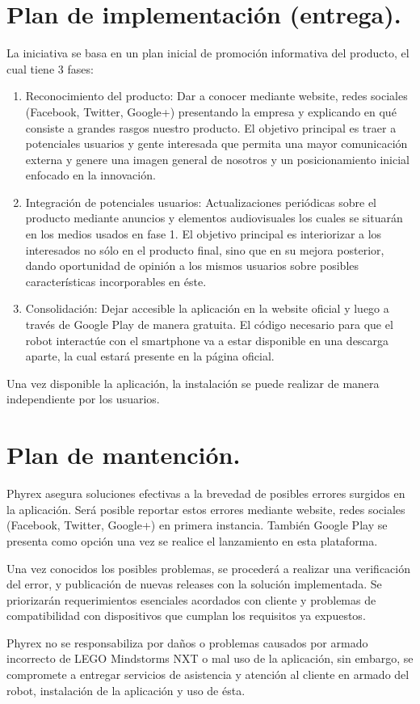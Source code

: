 \section{Plan de implementaci\'on (entrega).}
La iniciativa se basa en un plan inicial de promoci\'on informativa del producto, el cual tiene 3 fases:

\begin{enumerate}
\item  Reconocimiento del producto: Dar a conocer mediante website, redes sociales (Facebook, Twitter, Google+) presentando la empresa y explicando en qu\'e consiste a grandes rasgos nuestro producto. El objetivo principal es traer a potenciales usuarios y gente interesada que permita una mayor comunicaci\'on externa y genere una imagen general de nosotros y un posicionamiento inicial enfocado en la innovaci\'on.
\item Integraci\'on de potenciales usuarios: Actualizaciones peri\'odicas sobre el producto mediante anuncios y elementos audiovisuales los cuales se situar\'an en los medios usados en fase 1. El objetivo principal es interiorizar a los interesados no s\'olo en el producto final, sino que en su mejora posterior, dando oportunidad de opini\'on a los mismos usuarios sobre posibles caracter\'isticas incorporables en \'este.
\item Consolidaci\'on: Dejar accesible la aplicaci\'on en la website oficial y luego a trav\'es de Google Play de manera gratuita. El c\'odigo necesario para que el robot interact\'ue con el smartphone va a estar disponible en una descarga aparte, la cual estar\'a presente en la p\'agina oficial.
\end{enumerate}

Una vez disponible la aplicaci\'on, la instalaci\'on se puede realizar de manera independiente por los usuarios.

\newpage
\section{Plan de mantenci\'on.}
Phyrex asegura soluciones efectivas a la brevedad de posibles errores surgidos en la aplicaci\'on. Ser\'a posible reportar estos errores mediante website, redes sociales (Facebook, Twitter, Google+) en primera instancia. Tambi\'en Google Play se presenta como opci\'on una vez se realice el lanzamiento en esta plataforma.

Una vez conocidos los posibles problemas, se proceder\'a a realizar una verificaci\'on del error, y publicaci\'on de nuevas releases con la soluci\'on implementada. Se priorizar\'an requerimientos esenciales acordados con cliente y problemas de compatibilidad con dispositivos que cumplan los requisitos ya expuestos.

Phyrex no se responsabiliza por da\~nos o problemas causados por armado incorrecto de LEGO Mindstorms NXT o mal uso de la aplicaci\'on, sin embargo, se compromete a entregar servicios de asistencia y atenci\'on al cliente en armado del robot, instalaci\'on de la aplicaci\'on y uso de \'esta.

\newpage

